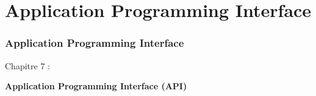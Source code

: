 %

\section{Application Programming Interface}
\begin{frame}[fragile]
	\frametitle{Application Programming Interface}

	\begin{center}\huge{Chapitre 7 :}\end{center}
	\begin{center}\huge{\color{typo3darkgrey}\textbf{Application Programming Interface (API)}}\end{center}

\end{frame}


